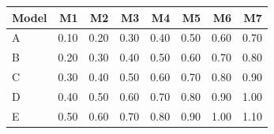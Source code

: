 \begin{table}[htbp]
\centering
\small
\begin{tabular}{lrrrrrrr}
\toprule
Model & M1 & M2 & M3 & M4 & M5 & M6 & M7 \\
\midrule
A & 0.10 & 0.20 & 0.30 & 0.40 & 0.50 & 0.60 & 0.70 \\
B & 0.20 & 0.30 & 0.40 & 0.50 & 0.60 & 0.70 & 0.80 \\
C & 0.30 & 0.40 & 0.50 & 0.60 & 0.70 & 0.80 & 0.90 \\
D & 0.40 & 0.50 & 0.60 & 0.70 & 0.80 & 0.90 & 1.00 \\
E & 0.50 & 0.60 & 0.70 & 0.80 & 0.90 & 1.00 & 1.10 \\
\bottomrule
\end{tabular}
\end{table}
